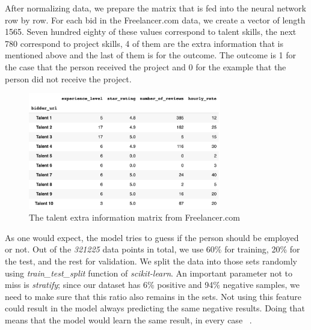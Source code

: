 After normalizing data, we prepare the matrix that is fed into the neural network row by row. For each bid in the Freelancer.com data, we create a vector of length 1565. Seven hundred eighty of these values correspond to talent skills, the next 780 correspond to project skills, 4 of them are the extra information that is mentioned above and the last of them is for the outcome. The outcome is 1 for the case that the person received the project and 0 for the example that the person did not receive the project.



\begin{figure}[htp]
	\centering
	\includegraphics[width=0.75\textwidth]{figures/FreelancerTalentMeta.png}
	\caption{The talent extra information matrix from Freelancer.com}
	\label{fig:freelancer-talent-meta}
\end{figure}

As one would expect, the model tries to guess if the person should be employed or not. Out of the \textit{321225} data points in total, we use 60\% for training, 20\% for the test, and the rest for validation. We split the data into those sets randomly using \textit{train\_test\_split} function of \textit{scikit-learn}. An important parameter not to miss is \textit{stratify}; since our dataset has  6\% positive and 94\% negative samples, we need to make sure that this ratio also remains in the sets. Not using this feature could result in the model always predicting the same negative results. Doing that means that the model would learn the same result, in every case ~\parencite{singh2015survey}.

